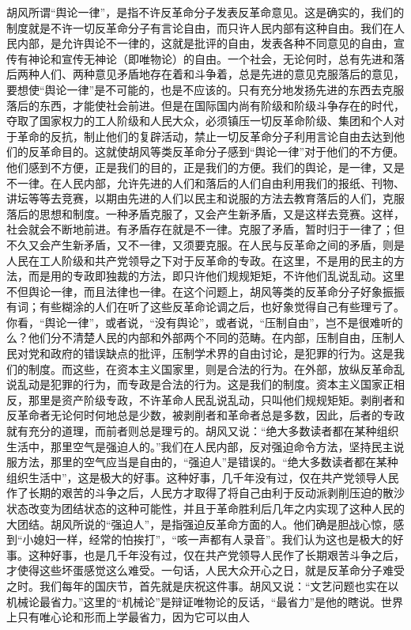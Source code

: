 \documentclass[cn,11pt,chinese]{elegantbook}
\begin{document}
胡风所谓“舆论一律”，是指不许反革命分子发表反革命意见。这是确实的，我们的制度就是不许一切反革命分子有言论自由，而只许人民内部有这种自由。我们在人民内部，是允许舆论不一律的，这就是批评的自由，发表各种不同意见的自由，宣传有神论和宣传无神论（即唯物论）的自由。一个社会，无论何时，总有先进和落后两种人们、两种意见矛盾地存在着和斗争着，总是先进的意见克服落后的意见，要想使“舆论一律”是不可能的，也是不应该的。只有充分地发扬先进的东西去克服落后的东西，才能使社会前进。但是在国际国内尚有阶级和阶级斗争存在的时代，夺取了国家权力的工人阶级和人民大众，必须镇压一切反革命阶级、集团和个人对于革命的反抗，制止他们的复辟活动，禁止一切反革命分子利用言论自由去达到他们的反革命目的。这就使胡风等类反革命分子感到“舆论一律”对于他们的不方便。他们感到不方便，正是我们的目的，正是我们的方便。我们的舆论，是一律，又是不一律。在人民内部，允许先进的人们和落后的人们自由利用我们的报纸、刊物、讲坛等等去竞赛，以期由先进的人们以民主和说服的方法去教育落后的人们，克服落后的思想和制度。一种矛盾克服了，又会产生新矛盾，又是这样去竞赛。这样，社会就会不断地前进。有矛盾存在就是不一律。克服了矛盾，暂时归于一律了；但不久又会产生新矛盾，又不一律，又须要克服。在人民与反革命之间的矛盾，则是人民在工人阶级和共产党领导之下对于反革命的专政。在这里，不是用的民主的方法，而是用的专政即独裁的方法，即只许他们规规矩矩，不许他们乱说乱动。这里不但舆论一律，而且法律也一律。在这个问题上，胡风等类的反革命分子好象振振有词；有些糊涂的人们在听了这些反革命论调之后，也好象觉得自己有些理亏了。你看，“舆论一律”，或者说，“没有舆论”，或者说，“压制自由”，岂不是很难听的么？他们分不清楚人民的内部和外部两个不同的范畴。在内部，压制自由，压制人民对党和政府的错误缺点的批评，压制学术界的自由讨论，是犯罪的行为。这是我们的制度。而这些，在资本主义国家里，则是合法的行为。在外部，放纵反革命乱说乱动是犯罪的行为，而专政是合法的行为。这是我们的制度。资本主义国家正相反，那里是资产阶级专政，不许革命人民乱说乱动，只叫他们规规矩矩。剥削者和反革命者无论何时何地总是少数，被剥削者和革命者总是多数，因此，后者的专政就有充分的道理，而前者则总是理亏的。胡风又说：“绝大多数读者都在某种组织生活中，那里空气是强迫人的。”我们在人民内部，反对强迫命令方法，坚持民主说服方法，那里的空气应当是自由的，“强迫人”是错误的。“绝大多数读者都在某种组织生活中”，这是极大的好事。这种好事，几千年没有过，仅在共产党领导人民作了长期的艰苦的斗争之后，人民方才取得了将自己由利于反动派剥削压迫的散沙状态改变为团结状态的这种可能性，并且于革命胜利后几年之内实现了这种人民的大团结。胡风所说的“强迫人”，是指强迫反革命方面的人。他们确是胆战心惊，感到“小媳妇一样，经常的怕挨打”，“咳一声都有人录音”。我们认为这也是极大的好事。这种好事，也是几千年没有过，仅在共产党领导人民作了长期艰苦斗争之后，才使得这些坏蛋感觉这么难受。一句话，人民大众开心之日，就是反革命分子难受之时。我们每年的国庆节，首先就是庆祝这件事。胡风又说：“文艺问题也实在以机械论最省力。”这里的“机械论”是辩证唯物论的反话，“最省力”是他的瞎说。世界上只有唯心论和形而上学最省力，因为它可以由人
\end{document}
